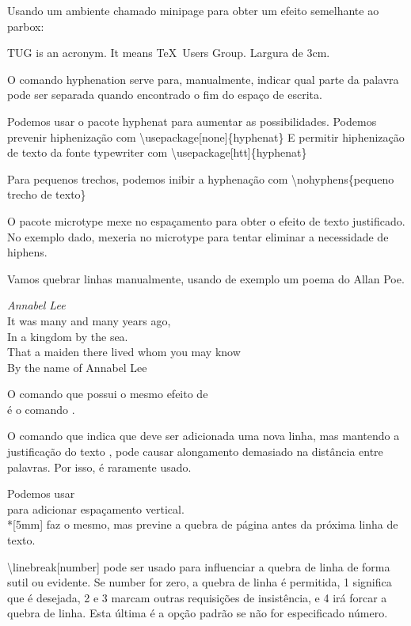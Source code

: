 \documentclass{article}
\begin{document}
Usando um ambiente chamado minipage para obter um efeito semelhante ao parbox:

\begin{minipage}{3cm}

    TUG is an acronym. It means \TeX\ Users Group. Largura de 3cm.

\end{minipage}

O comando hyphenation serve para, manualmente, indicar qual parte da palavra pode ser separada quando encontrado o fim do espaço de escrita.

Podemos usar o pacote hyphenat para aumentar as possibilidades.
Podemos prevenir hiphenização com
\textbackslash usepackage[none]\{hyphenat\}
E permitir hiphenização de texto da fonte typewriter com
\textbackslash usepackage[htt]\{hyphenat\}

Para pequenos trechos, podemos inibir a hyphenação com \textbackslash nohyphens\{pequeno trecho de texto\}

O pacote microtype mexe no espaçamento para obter o efeito de texto justificado.
No exemplo dado, mexeria no microtype para tentar eliminar a necessidade de hiphens.

Vamos quebrar linhas manualmente, usando de exemplo um poema do Allan Poe.

\emph{Annabel Lee} \\[3mm]
It was many and many years ago, \\
In a kingdom by the sea. \\
That a maiden there lived whom you may know \\
By the name of Annabel Lee

O comando que possui o mesmo efeito de \\
é o comando \newline.

O comando que indica que deve ser adicionada uma nova linha,
mas mantendo a justificação do texto \linebreak, pode causar
alongamento demasiado na distância entre palavras.
Por isso, é raramente usado.

Podemos usar \\[3mm] para adicionar espaçamento vertical.
\\*[5mm] faz o mesmo, mas previne a quebra de página antes da
próxima linha de texto.

\textbackslash linebreak[number] pode ser usado para influenciar a quebra de linha de forma sutil ou evidente.
Se number for zero, a quebra de linha é permitida, 1 significa que é desejada, 2 e 3 marcam outras requisições de insistência, e 4 irá forcar a quebra de linha.
Esta última é a opção padrão se não for especificado número.
\end{document}
